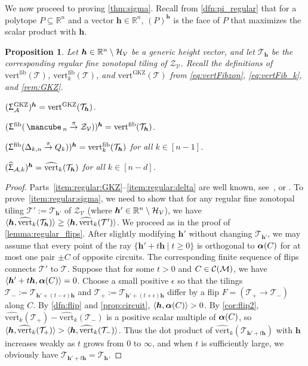 \documentclass[11pt]{amsart}
\makeatletter
\newcommand{\itemrefperh@ps}[2]{\textup{#2}}
\newcommand{\itemref}[1]{\begingroup\let\perh@ps\itemrefperh@ps\ref{#1}\endgroup}
\theoremstyle{plain}
\newtheorem{proposition}[theorem]{Proposition}
\theoremstyle{definition}
\def\R{\mathbb{R}}
\def\A{\mathcal{A}}
\def\V{\mathcal{V}}
\def\h{{\bm{h}}}
\def\Zon{\mathcal{Z}}
\def\ZV{\Zon_\V}
\def\cube{\mbox{\,\mancube\,}}
\def\GKZ{{\operatorname{GKZ}}}
\newcommand\wh[1]{\hstretch{2}{\hat{\hstretch{0.5}{#1}}}}
\def\vert{\mathrm{vert}}
\def\vertHSP{\wh\vert}
\def\vertHSP{\widehat{\vert}}
\def\vertGKZ{\vert^\GKZ}
\def\vertFib{\vert^\fiber}
\def\HSP{\widehat\Upsigma}
\def\Sigma{\HSP}
\def\fiber{{\operatorname{fib}}}
\def\FibPoly{\Upsigma^\fiber}
\def\SigmaGKZ{\Upsigma_\A^{\GKZ}}
\def\pito{\overset \pi \to}
\def\VC{\V}
\def\Tcal{\mathcal{T}}
\def\Tiling{\Tcal}
\let\subset\subseteq
\makeatother
\begin{document}
We now proceed to proving \cref{thm:sigma}. Recall from \cref{dfn:pi_regular} that for a polytope $P\subset \R^n$ and a vector $\h\in\R^n$, $(P)^\h$ is the face of $P$ that maximizes the scalar product with $\h$.
\begin{proposition}\label{prop:regular}
Let $\h\in\GHV$ be a generic height vector, and let $\Tiling_\h$ be the corresponding regular fine zonotopal tiling of $\ZV$. 
Recall the definitions of 
  $\vertFib(\Tiling)$, 
	$\vertFib_k(\Tiling)$, and $\vertGKZ(\Tiling)$
from 	\eqref{eq:vertFibzon},
 \eqref{eq:vertFib_k}, and 
\cref{rem:GKZ}.
\begin{theoremlist}
\item\label{item:regular:GKZ} $(\SigmaGKZ)^\h=\vertGKZ(\Tiling_\h)$.  
\item\label{item:regular:cube}   $(\FibPoly(\cube_n\pito \Zon_\VC))^\h=\vertFib(\Tiling_\h)$.
\item\label{item:regular:delta}   $(\FibPoly(\Delta_{k,n}\pito Q_k))^\h=\vertFib_k(\Tiling_\h)$ for all $k\in[n-1]$.
\item\label{item:regular:sigma} $(\Sigma_{\A,k})^\h=\vertHSP_k(\Tiling_\h)$ for all $k\in[n-d]$.
\end{theoremlist}
\end{proposition}
\begin{proof}
Parts~\itemref{item:regular:GKZ}--\itemref{item:regular:delta} are well known, see~\cite[Proposition~1.2, the proof of Theorem~2.5, Corollary~4.2]{BS}, or 
\cite[the proof of Theorem~9.6]{Ziegler}.  To prove~\itemref{item:regular:sigma}, we need to show that for any regular fine zonotopal tiling $\Tiling':=\Tiling_{\h'}$ of $\ZV$ (where $\h'\in\GHV$), we have $\<\h,\vertHSP_k(\Tiling_\h)\>\geq\<\h,\vertHSP_k(\Tiling')\>$. We proceed as in the proof of \cref{lemma:regular_flips}. After slightly modifying $\h'$ without changing $\Tiling_{\h'}$, we may assume that every point of the ray $\{\h'+t\h\mid t\geq0\}$ is orthogonal to $\bm{\alpha}(C)$ for at most one pair $\pm C$ of opposite circuits. The corresponding finite sequence of flips connects $\Tiling'$ to $\Tiling$. Suppose that for some $t>0$ and $C\in\mathcal{C}(\mathcal{M})$, we have $\<\h'+t\h,\alphaC\>=0$. Choose a small positive $\epsilon$ so that the tilings  $\Tiling_-:=\Tiling_{\h'+(t-\epsilon)\h}$ and $\Tiling_+:=\Tiling_{\h'+(t+\epsilon)\h}$ differ by a flip $F=(\Tiling_+\to\Tiling_-)$ along $C$. 
	By \cref{dfn:flip} and \cref{prop:circuit},
	$\<\h,\alphaC\>>0$. By \cref{cor:flip2}, $\vertHSP_k(\Tiling_+)-\vertHSP_k(\Tiling_-)$ is a positive scalar multiple of $\bm{\alpha}(C)$, so $\<\h,\vertHSP_k(\Tiling_+)\>>\<\h,\vertHSP_k(\Tiling_-)\>$. Thus the dot product of $\vertHSP_k(\Tiling_{\h'+t\h})$ with $\h$ increases weakly as $t$ grows from $0$ to $\infty$, and when $t$ is sufficiently large, we obviously have $\Tiling_{\h'+t\h}=\Tiling_{\h}$.
\end{proof}
\end{document}
